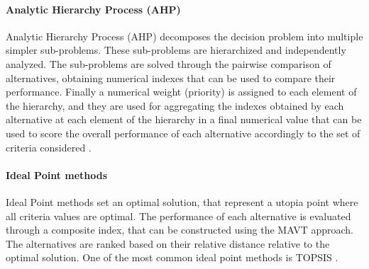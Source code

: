 \begin{refsection}[referencesCh1]
\paragraph{Analytic Hierarchy Process (AHP)}
Analytic Hierarchy Process (AHP) decomposes the decision problem into multiple simpler sub-problems. These sub-problems are hierarchized and independently analyzed. The sub-problems are solved through the pairwise comparison of alternatives, obtaining numerical indexes that can be used to compare their performance. Finally a numerical weight (priority) is assigned to each element of the hierarchy, and they are used for aggregating the indexes obtained by each alternative at each element of the hierarchy in a final numerical value that can be used to score the overall performance of each alternative accordingly to the set of criteria considered \citep{saaty2000fundamentals}. 

\paragraph{Ideal Point methods}
Ideal Point methods set an optimal solution, that represent a utopia point where all criteria values are optimal. The performance of each alternative is evaluated through a composite index, that can be constructed using the
MAVT approach. The alternatives are ranked based on their relative distance relative to the optimal solution. One of the most common ideal point methods is TOPSIS \citep{hwang1995multi}.




\end{refsection}
